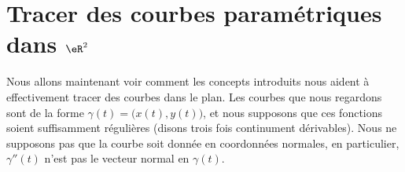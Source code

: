 \section{Tracer des courbes paramétriques dans $\eR^2$}     \label{SecTracerParmCourbe}

Nous allons maintenant voir comment les concepts introduits nous aident à effectivement tracer des courbes dans le plan. Les courbes que nous regardons sont de la forme $\gamma(t)=\big( x(t),y(t) \big)$, et nous supposons que ces fonctions soient suffisamment régulières (disons trois fois continument dérivables). Nous ne supposons pas que la courbe soit donnée en coordonnées normales, en particulier, $\gamma''(t)$ n'est pas le vecteur normal en $\gamma(t)$.

